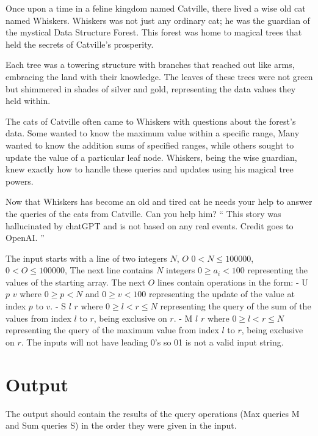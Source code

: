 

Once upon a time in a feline kingdom named Catville, there lived a wise old cat named Whiskers. Whiskers was not just any ordinary cat; he was the guardian of the mystical Data Structure Forest. This forest was home to magical trees that held the secrets of Catville's prosperity.

Each tree was a towering structure with branches that reached out like arms, embracing the land with their knowledge. The leaves of these trees were not green but shimmered in shades of silver and gold, representing the data values they held within.

The cats of Catville often came to Whiskers with questions about the forest's data. Some wanted to know the maximum value within a specific range, Many wanted to know the addition sums of specified ranges, while others sought to update the value of a particular leaf node. Whiskers, being the wise guardian, knew exactly how to handle these queries and updates using his magical tree powers.

Now that Whiskers has become an old and tired cat he needs your help to answer the queries of the cats from Catville. Can you help him?
`` This story was hallucinated by chatGPT and is not based on any real events. Credit goes to OpenAI. '' 

{\setlength{\parindent}{0cm}
}
\begin{Input}
The input starts with a line of two integers $N$, $O$
{\setlength{\parindent}{0cm}
$0 < N \leq 100 000$,
$0 < O \leq 100 000$, 
The next line contains $N$ integers $0 \geq a_i < 100$ representing the values of the starting array.  
The next $O$ lines contain operations in the form:
    - U $p$ $v$ where $0 \geq p < N$ and $0 \geq v < 100$ representing the update of the value at index $p$ to $v$.
    - S $l$ $r$ where $0 \geq l < r \leq N$ representing the query of the sum of the values from index $l$ to $r$, being exclusive on $r$.
    - M $l$ $r$ where $0 \geq l < r \leq N$ representing the query of the maximum value from index $l$ to $r$, being exclusive on $r$.
}
{\setlength{\parindent}{0cm}
The inputs will not have leading 0's so 01 is not a valid input string.
}
\end{Input}

\section*{Output}
The output should contain the results of the query operations (Max queries M and Sum queries S) in the order they were given in the input. 
{\setlength{\parindent}{0cm}
}
